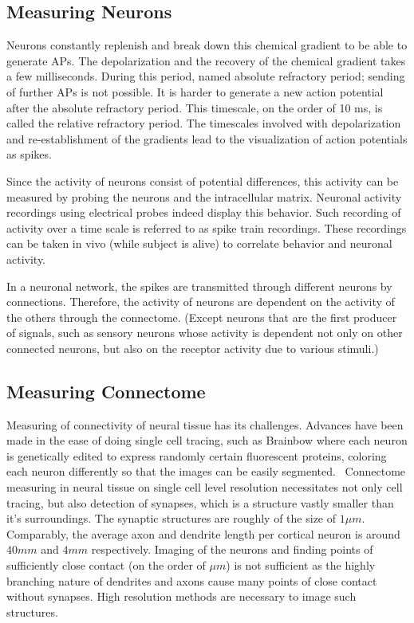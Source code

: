 \documentclass[../dissertation.tex]{subfiles}
\begin{document}
\subsection{Measuring Neurons}

Neurons constantly replenish and break down this chemical gradient to be able to generate APs.
The depolarization and the recovery of the chemical gradient takes a few milliseconds.
During this period, named absolute refractory period; sending of further APs is not possible.
It is harder to generate a new action potential after the absolute refractory period.
This timescale, on the order of 10 ms, is called the relative refractory period.
The timescales involved with depolarization and re-establishment of the gradients lead to the visualization of action potentials as spikes.

Since the activity of neurons consist of potential differences, this activity can be measured by probing the neurons and the intracellular matrix.
Neuronal activity recordings using electrical probes indeed display this behavior.
Such recording of activity over a time scale is referred to as spike train recordings.
These recordings can be taken in vivo (while subject is alive) to correlate behavior and neuronal activity.

In a neuronal network, the spikes are transmitted through different neurons by connections.
Therefore, the activity of neurons are dependent on the activity of the others through the connectome.
(Except neurons that are the first producer of signals, such as sensory neurons whose activity is dependent not only on other connected neurons, but also on the receptor activity due to various stimuli.)

\subsection{Measuring Connectome}

Measuring of connectivity of neural tissue has its challenges.
Advances have been made in the ease of doing single cell tracing, such as Brainbow where each neuron is genetically edited to express randomly certain fluorescent proteins, coloring each neuron differently so that the images can be easily segmented.~\cite{Weissman.Pan2015}
Connectome measuring in neural tissue on single cell level resolution necessitates not only cell tracing, but also detection of synapses, which is a structure vastly smaller than it's surroundings.
The synaptic structures are roughly of the size of $1\mu m$.
Comparably, the average axon and dendrite length per cortical neuron is around $40 mm$ and $4 mm$ respectively.
Imaging of the neurons and finding points of sufficiently close contact (on the order of $\mu m$) is not sufficient as the highly branching nature of dendrites and axons cause many points of close contact without synapses.
High resolution methods are necessary to image such structures.
\end{document}
